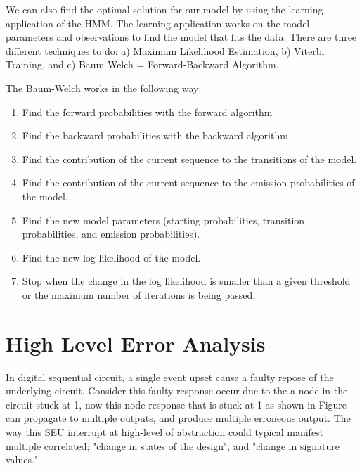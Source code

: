 We can also find the optimal solution for our model by using the learning application of the HMM. The learning application works on the model parameters and observations to find the model that fits the data. There are three different techniques to do: a) Maximum Likelihood Estimation, b) Viterbi Training, and c) Baum  Welch = Forward-Backward Algorithm. 

The Baum-Welch works in the following way:

\begin{enumerate}


\item Find the forward probabilities with the forward algorithm
\item Find the backward probabilities with the backward algorithm
\item Find the contribution of the current sequence to the transitions of the model.
\item Find the contribution of the current sequence to the emission probabilities of the model.
\item Find the new model parameters (starting probabilities, transition probabilities, and emission probabilities).
\item Find the new log likelihood of the model.
\item Stop when the change in the log likelihood is smaller than a given threshold or the maximum number of iterations is being passed.

\end{enumerate} 














\section{High Level Error Analysis}






In digital sequential circuit, a single event upset cause a  faulty repose of the underlying circuit. Consider this faulty response occur due to the a node in the circuit stuck-at-1, now this node response that is stuck-at-1 as shown in Figure~ can propagate to multiple outputs, and produce multiple erroneous output. The way this SEU interrupt at high-level of abstraction could typical manifest multiple correlated; "change in states of the design", and "change in signature values."

